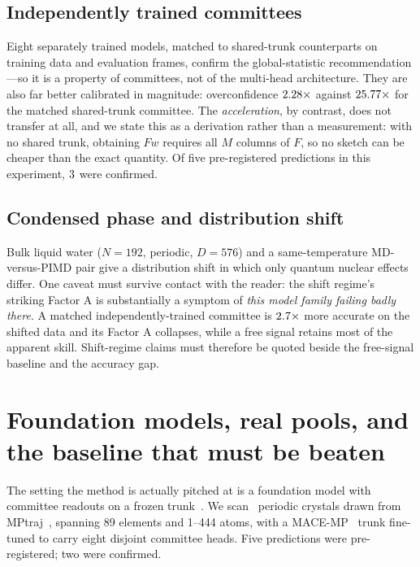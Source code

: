 \subsection{Independently trained committees}
Eight separately trained models, matched to shared-trunk counterparts on training
data and evaluation frames, confirm the global-statistic recommendation---so it is
a property of committees, not of the multi-head architecture. They are also far
better calibrated in magnitude: overconfidence $2.28\times$ against
$25.77\times$ for the matched shared-trunk committee. The
\emph{acceleration}, by contrast, does not transfer at all, and we state this as a
derivation rather than a measurement: with no shared trunk, obtaining $Fw$
requires all $M$ columns of $F$, so no sketch can be cheaper than the exact
quantity. Of five pre-registered predictions in this experiment,
$3$ were confirmed.

\subsection{Condensed phase and distribution shift}
Bulk liquid water ($N=192$, periodic, $D=576$) and a same-temperature
MD-versus-PIMD pair give a distribution shift in which only quantum nuclear
effects differ. One caveat must survive contact with the reader: the shift
regime's striking Factor A is substantially a symptom of \emph{this model family
failing badly there}. A matched independently-trained committee is $2.7\times$
more accurate on the shifted data and its Factor A collapses, while a free signal
retains most of the apparent skill. Shift-regime claims must therefore be quoted
beside the free-signal baseline and the accuracy gap.

\section{Foundation models, real pools, and the baseline that must be beaten}
\label{sec:foundation}

The setting the method is actually pitched at is a foundation model with
committee readouts on a frozen trunk~\citep{batatia2023foundation}. We scan
\fsMPtrajN\ periodic crystals drawn from MPtraj~\citep{deng2023chgnet},
spanning 89 elements and 1--444 atoms, with a
MACE-MP~\citep{batatia2022mace} trunk fine-tuned to carry
eight disjoint committee heads. Five predictions were pre-registered; two were
confirmed.

